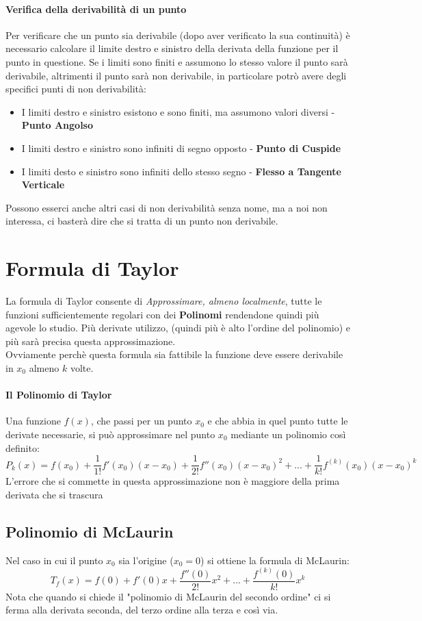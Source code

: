 \paragraph*{Verifica della derivabilità di un punto} Per verificare che un punto sia derivabile 
(dopo aver verificato la sua continuità) è necessario calcolare il limite destro e sinistro della derivata della funzione per il punto in questione.
Se i limiti sono finiti e assumono lo stesso valore il punto sarà derivabile, altrimenti il punto sarà non derivabile, in particolare potrò avere
degli specifici punti di non derivabilità:
\begin{itemize}
	\item I limiti destro e sinistro esistono e sono finiti, ma assumono valori diversi - \textbf{Punto Angolso}
	\item I limiti destro e sinistro sono infiniti di segno opposto - \textbf{Punto di Cuspide}
	\item I limiti desto e sinistro sono infiniti dello stesso segno - \textbf{Flesso a Tangente Verticale}
\end{itemize}
Possono esserci anche altri casi di non derivabilità senza nome, ma a noi non interessa, ci basterà dire che si tratta di un punto non derivabile.

\section{Formula di Taylor}
La formula di Taylor consente di \emph{Approssimare, almeno localmente}, tutte le funzioni sufficientemente regolari con dei \textbf{Polinomi}
rendendone quindi più agevole lo studio. Più derivate utilizzo, (quindi più è alto l'ordine del polinomio) e più sarà precisa questa approssimazione.
\\Ovviamente perchè questa formula sia fattibile la funzione deve essere derivabile in $x_0$ almeno $k$ volte.

\paragraph*{Il Polinomio di Taylor}
Una funzione $f(x)$, che passi per un punto $x_0$ e che abbia in quel punto tutte le derivate necessarie,
si può approssimare nel punto $x_0$ mediante un polinomio così definito:
$$P_k(x)=f(x_0)+\frac{1}{1!}f'(x_0)(x-x_0) + \frac{1}{2!}f''(x_0)(x-x_0)^2 +... + \frac{1}{k!}f^{(k)}(x_0)(x-x_0)^k$$
L'errore che si commette in questa approssimazione non è maggiore della prima derivata che si trascura
\subsection*{Polinomio di McLaurin}
Nel caso in cui il punto $x_0$ sia l'origine ($x_0=0$) si ottiene la formula di McLaurin:
$$T_f(x) = f(0) + f'(0)x + \frac{f''(0)}{2!}x^2 +...+ \frac{f^{(k)}(0)}{k!}x^k$$
Nota che quando si chiede il "polinomio di McLaurin del secondo ordine" ci si ferma alla derivata seconda, del terzo ordine alla terza e così via.


